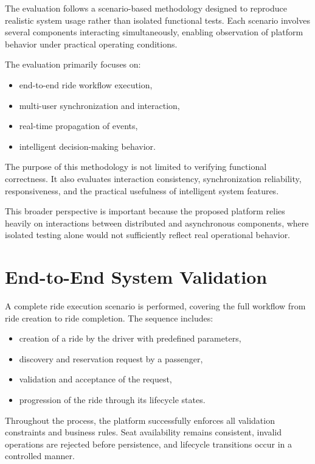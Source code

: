 The evaluation follows a scenario-based methodology designed to reproduce realistic system usage rather than isolated functional tests. Each scenario involves several components interacting simultaneously, enabling observation of platform behavior under practical operating conditions.

The evaluation primarily focuses on:

\begin{itemize}
    \item end-to-end ride workflow execution,
    \item multi-user synchronization and interaction,
    \item real-time propagation of events,
    \item intelligent decision-making behavior.
\end{itemize}

The purpose of this methodology is not limited to verifying functional correctness. It also evaluates interaction consistency, synchronization reliability, responsiveness, and the practical usefulness of intelligent system features.

This broader perspective is important because the proposed platform relies heavily on interactions between distributed and asynchronous components, where isolated testing alone would not sufficiently reflect real operational behavior.


\section{End-to-End System Validation}

A complete ride execution scenario is performed, covering the full workflow from ride creation to ride completion. The sequence includes:

\begin{itemize}
    \item creation of a ride by the driver with predefined parameters,
    \item discovery and reservation request by a passenger,
    \item validation and acceptance of the request,
    \item progression of the ride through its lifecycle states.
\end{itemize}

Throughout the process, the platform successfully enforces all validation constraints and business rules. Seat availability remains consistent, invalid operations are rejected before persistence, and lifecycle transitions occur in a controlled manner.

